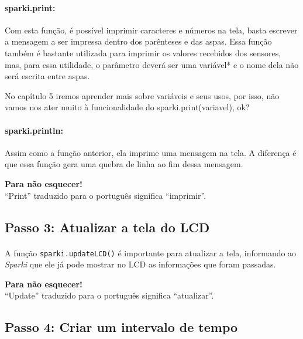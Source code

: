 \paragraph{sparki.print:} 
Com esta função, é possível imprimir caracteres e números na tela, basta escrever a mensagem a ser impressa dentro dos parênteses e das aspas. Essa função também é bastante utilizada para imprimir os valores recebidos dos sensores, mas, para essa utilidade, o parâmetro deverá ser uma variável* e o nome dela não será escrita entre aspas.
\par* No capítulo 5 iremos aprender mais sobre variáveis e seus usos, por isso, não vamos nos ater muito à funcionalidade do sparki.print(variavel), ok?
  
\paragraph{sparki.println:}
Assim como a função anterior, ela imprime uma mensagem na tela. A diferença é que essa função gera uma quebra de linha ao fim dessa mensagem.

\begin{center}
    \textcolor{mydarkblue}{\textbf{Para não esquecer!}} 
    \\ ``Print'' traduzido para o português significa ``imprimir''.
\end{center}

\subsection{Passo 3: Atualizar a tela do LCD}

\paragraph{}
A função \lstinline[columns=fixed]{sparki.updateLCD()} é importante para atualizar a tela, informando ao \textit{Sparki} que ele já pode mostrar no LCD as informações que foram passadas.

\begin{center}
    \textcolor{mydarkblue}{\textbf{Para não esquecer!}} 
    \\ ``Update'' traduzido para o português significa ``atualizar''.
\end{center}

\subsection{Passo 4: Criar um intervalo de tempo}
